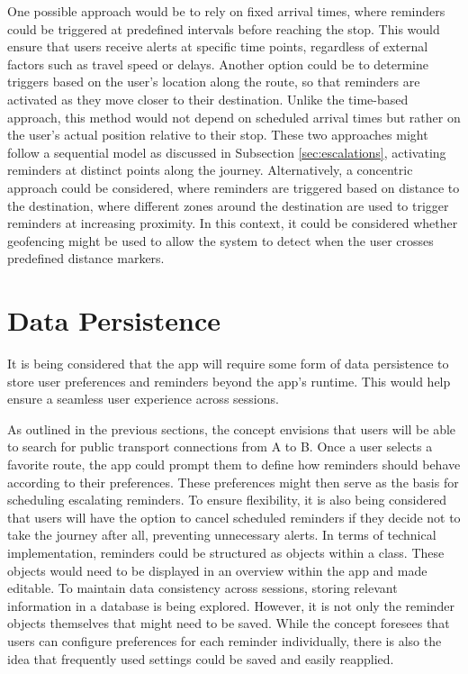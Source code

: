 One possible approach would be to rely on fixed arrival times, where reminders could be triggered at predefined intervals before reaching the stop.
This would ensure that users receive alerts at specific time points, regardless of external factors such as travel speed or delays. 
Another option could be to determine triggers based on the user's location along the route, so that reminders are activated as they move closer to their destination. 
Unlike the time-based approach, this method would not depend on scheduled arrival times but rather on the user's actual position relative to their stop.
These two approaches might follow a sequential model as discussed in Subsection \ref{sec:escalations}, activating reminders at distinct points along the journey. 
Alternatively, a concentric approach could be considered, where reminders are triggered based on distance to the destination, where different zones around the destination are used to trigger reminders at increasing proximity.
In this context, it could be considered whether geofencing might be used to allow the system to detect when the user crosses predefined distance markers.

\section{Data Persistence}
It is being considered that the app will require some form of data persistence to store user preferences and reminders beyond the app's runtime. 
This would help ensure a seamless user experience across sessions.

As outlined in the previous sections, the concept envisions that users will be able to search for public transport connections from A to B. 
Once a user selects a favorite route, the app could prompt them to define how reminders should behave according to their preferences. 
These preferences might then serve as the basis for scheduling escalating reminders.
To ensure flexibility, it is also being considered that users will have the option to cancel scheduled reminders if they decide not to take the journey after all, preventing unnecessary alerts.
In terms of technical implementation, reminders could be structured as objects within a class. 
These objects would need to be displayed in an overview within the app and made editable. 
To maintain data consistency across sessions, storing relevant information in a database is being explored.
However, it is not only the reminder objects themselves that might need to be saved. 
While the concept foresees that users can configure preferences for each reminder individually, there is also the idea that frequently used settings could be saved and easily reapplied.

